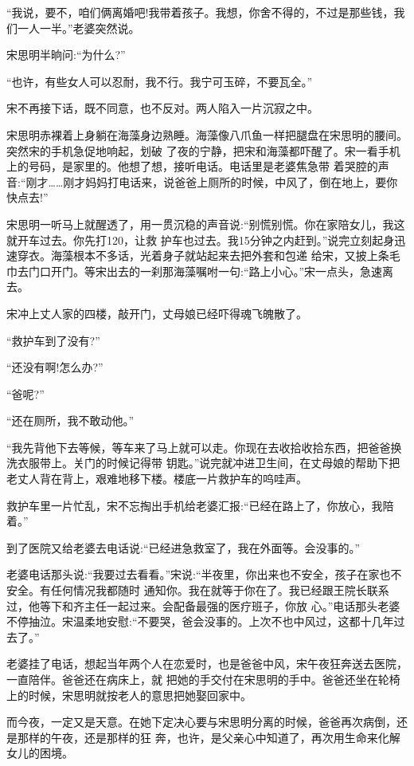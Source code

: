 \documentclass[11pt,a4paper,onecolumn]{article}
\begin{document}
``我说，要不，咱们俩离婚吧!我带着孩子。我想，你舍不得的，不过是那些钱，我们一人一半。''老婆突然说。

宋思明半晌问:``为什么?''

``也许，有些女人可以忍耐，我不行。我宁可玉碎，不要瓦全。''

宋不再接下话，既不同意，也不反对。两人陷入一片沉寂之中。

宋思明赤裸着上身躺在海藻身边熟睡。海藻像八爪鱼一样把腿盘在宋思明的腰间。突然宋的手机急促地响起，划破
了夜的宁静，把宋和海藻都吓醒了。宋一看手机上的号码，是家里的。他想了想，接听电话。电话里是老婆焦急带
着哭腔的声音:``刚才……刚才妈妈打电话来，说爸爸上厕所的时候，中风了，倒在地上，要你快点去!''

宋思明一听马上就醒透了，用一贯沉稳的声音说:``别慌别慌。你在家陪女儿，我这就开车过去。你先打120，让救
护车也过去。我15分钟之内赶到。''说完立刻起身迅速穿衣。海藻根本不多话，光着身子就站起来去把外套和包递
给宋，又披上条毛巾去门口开门。等宋出去的一刹那海藻嘱咐一句:``路上小心。''宋一点头，急速离去。

宋冲上丈人家的四楼，敲开门，丈母娘已经吓得魂飞魄散了。

``救护车到了没有?''

``还没有啊!怎么办?''

``爸呢?''

``还在厕所，我不敢动他。''

``我先背他下去等候，等车来了马上就可以走。你现在去收拾收拾东西，把爸爸换洗衣服带上。关门的时候记得带
钥匙。''说完就冲进卫生间，在丈母娘的帮助下把老丈人背在背上，艰难地移下楼。楼底一片救护车的呜哇声。

救护车里一片忙乱，宋不忘掏出手机给老婆汇报:``已经在路上了，你放心，我陪着。''

到了医院又给老婆去电话说:``已经进急救室了，我在外面等。会没事的。''

老婆电话那头说:``我要过去看看。''宋说:``半夜里，你出来也不安全，孩子在家也不安全。有任何情况我都随时
通知你。我在就等于你在了。我已经跟王院长联系过，他等下和齐主任一起过来。会配备最强的医疗班子，你放
心。''电话那头老婆不停抽泣。宋温柔地安慰:``不要哭，爸会没事的。上次不也中风过，这都十几年过去了。''

老婆挂了电话，想起当年两个人在恋爱时，也是爸爸中风，宋午夜狂奔送去医院，一直陪伴。爸爸还在病床上，就
把她的手交付在宋思明的手中。爸爸还坐在轮椅上的时候，宋思明就按老人的意思把她娶回家中。

而今夜，一定又是天意。在她下定决心要与宋思明分离的时候，爸爸再次病倒，还是那样的午夜，还是那样的狂
奔，也许，是父亲心中知道了，再次用生命来化解女儿的困境。
\end{document}
